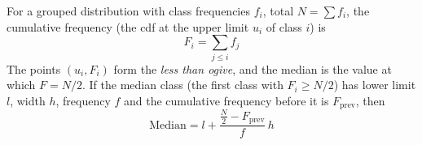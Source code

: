 \item For a grouped distribution with class frequencies $f_i$, total $N = \sum f_i$, the cumulative frequency (the cdf at the upper limit $u_i$ of class $i$) is
\begin{equation}
F_i = \sum_{j \le i} f_j
\label{c10eq:cumfreq}
\end{equation}
The points $(u_i, F_i)$ form the \emph{less than ogive}, and the median is the value at which $F = N/2$. If the median class (the first class with $F_i \ge N/2$) has lower limit $l$, width $h$, frequency $f$ and the cumulative frequency before it is $F_{\text{prev}}$, then
\begin{equation}
\text{Median} = l + \frac{\frac{N}{2} - F_{\text{prev}}}{f}\,h
\label{c10eq:mediangrouped}
\end{equation}

